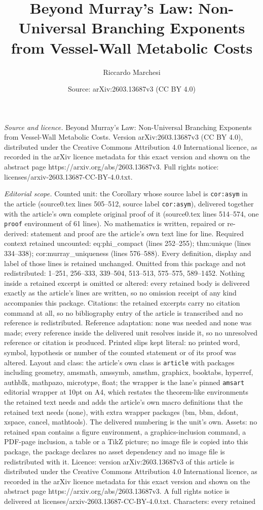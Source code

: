\documentclass[10pt,a4paper]{amsart}
\title[Beyond Murray's Law: Non-Universal Branching Exponents from ]{Beyond Murray's Law: Non-Universal Branching Exponents from Vessel-Wall Metabolic Costs}
\author{Riccardo Marchesi}
\date{Source: arXiv:2603.13687v3 (CC BY 4.0)}
\begin{document}
\maketitle

\noindent\emph{Source and licence.} Beyond Murray's Law: Non-Universal Branching Exponents from Vessel-Wall Metabolic Costs. Version arXiv:2603.13687v3 (CC BY 4.0), distributed under the Creative Commons Attribution 4.0 International licence, as recorded in the arXiv licence metadata for this exact version and shown on the abstract page https://arxiv.org/abs/2603.13687v3. Full rights notice: licenses/arxiv-2603.13687-CC-BY-4.0.txt.\par\smallskip

\noindent\textit{Editorial scope.} Counted unit: the Corollary whose source label is \texttt{cor:asym} in the article (source0.tex lines 505--512, source label \texttt{cor:asym}), delivered together with the article's own complete original proof of it (source0.tex lines 514--574, one \texttt{proof} environment of 61 lines). No mathematics is written, repaired or re-derived: statement and proof are the article's own text line for line. Required context retained uncounted: eq:phi\_compact (lines 252--255); thm:unique (lines 334--338); cor:murray\_uniqueness (lines 576--588). Every definition, display and label of those lines is retained unchanged. Omitted from this package and not redistributed: 1--251, 256--333, 339--504, 513--513, 575--575, 589--1452. Nothing inside a retained excerpt is omitted or altered: every retained body is delivered exactly as the article's lines are written, so no omission receipt of any kind accompanies this package. Citations: the retained excerpts carry no citation command at all, so no bibliography entry of the article is transcribed and no reference is redistributed. Reference adaptation: none was needed and none was made; every reference inside the delivered unit resolves inside it, so no unresolved reference or citation is produced. Printed slips kept literal: no printed word, symbol, hypothesis or number of the counted statement or of its proof was altered. Layout and class: the article's own class is \texttt{article} with packages including geometry, amsmath, amssymb, amsthm, graphicx, booktabs, hyperref, authblk, mathpazo, microtype, float; the wrapper is the lane's pinned \texttt{amsart} editorial wrapper at 10pt on A4, which restates the theorem-like environments the retained text needs and adds the article's own macro definitions that the retained text needs (none), with extra wrapper packages (bm, bbm, dsfont, xspace, cancel, mathtools). The delivered numbering is the unit's own. Assets: no retained span contains a figure environment, a graphics-inclusion command, a PDF-page inclusion, a table or a TikZ picture; no image file is copied into this package, the package declares no asset dependency and no image file is redistributed with it. Licence: version arXiv:2603.13687v3 of this article is distributed under the Creative Commons Attribution 4.0 International licence, as recorded in the arXiv licence metadata for this exact version and shown on the abstract page https://arxiv.org/abs/2603.13687v3. A full rights notice is delivered at licenses/arxiv-2603.13687-CC-BY-4.0.txt. Characters: every retained 
\end{document}

